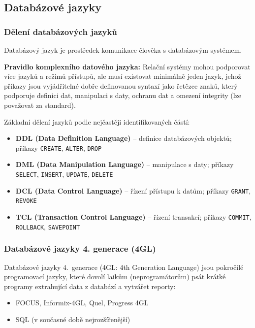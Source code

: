 \documentclass[12pt,a4paper]{article}
\begin{document}
\subsection{Databázové jazyky}

\subsubsection{Dělení databázových jazyků}

Databázový jazyk je prostředek komunikace člověka s databázovým systémem.

\textbf{Pravidlo komplexního datového jazyka:} Relační systémy mohou podporovat více jazyků a
režimů přístupů, ale musí existovat minimálně jeden jazyk, jehož příkazy jsou vyjádřitelné dobře
definovanou syntaxí jako řetězce znaků, který podporuje definici dat, manipulaci s daty, ochranu dat
a omezení integrity (lze považovat za standard).

Základní dělení jazyků podle nejčastěji identifikovaných částí:
\begin{itemize}
  \item \textbf{DDL (Data Definition Language)} -- definice databázových objektů; příkazy
    \texttt{CREATE}, \texttt{ALTER}, \texttt{DROP}
  \item \textbf{DML (Data Manipulation Language)} -- manipulace s daty; příkazy
    \texttt{SELECT}, \texttt{INSERT}, \texttt{UPDATE}, \texttt{DELETE}
  \item \textbf{DCL (Data Control Language)} -- řízení přístupu k datům; příkazy
    \texttt{GRANT}, \texttt{REVOKE}
  \item \textbf{TCL (Transaction Control Language)} -- řízení transakcí; příkazy
    \texttt{COMMIT}, \texttt{ROLLBACK}, \texttt{SAVEPOINT}
\end{itemize}

\subsubsection{Databázové jazyky 4. generace (4GL)}

Databázové jazyky 4.~generace (4GL: 4th Generation Language) jsou pokročilé programovací jazyky,
které dovolí laikům (neprogramátorům) psát krátké programy extrahující data z databází a vytvářet
reporty:
\begin{itemize}
  \item FOCUS, Informix-4GL, Quel, Progress 4GL
  \item SQL (v současné době nejrozšířenější)
\end{itemize}
\end{document}
